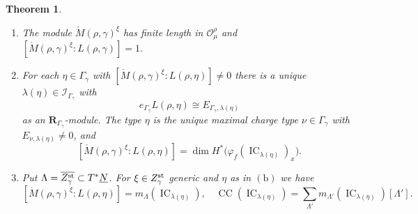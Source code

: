 \documentclass[11pt,reqno]{amsart}
\newtheorem{Theorem}{Theorem}[section]
\theoremstyle{definition}
\theoremstyle{remark}
\def\dN{\underline N}
\def\scrO{\mathscr O}
\def\IC{\operatorname{IC}}
\def\bR{\mathbf R}
\begin{document}
\begin{Theorem}\label{thm:morse-JH}
\hfill
\begin{enumerate}[label=$\mathrm{(\alph*)}$,leftmargin=8mm]
\item\label{item:morse-JH-length}
The module $\mathring M(\rho,\gamma)^\xi$ has finite length in
$\scrO_\mu^\rho$ and $[\mathring M(\rho,\gamma)^\xi:L(\rho,\gamma)]=1.$


\item\label{item:morse-JH-global}
For each $\eta\in\Gamma_\gamma$ with
$[\mathring M(\rho,\gamma)^\xi:L(\rho,\eta)]\ne0$ there is a
unique $\lambda(\eta)\in\mathcal I_{\Gamma_\gamma}$ with
$$e_{\Gamma_\gamma} L(\rho,\eta)\cong E_{\Gamma_\gamma,\lambda(\eta)}$$ as an $\bR_{\Gamma_\gamma}$-module.
The type $\eta$ is the unique maximal charge type
$\nu\in\Gamma_\gamma$ with $E_{\nu,\lambda(\eta)}\ne0$, and
\begin{equation}\label{eq:morse-JH-global}
 [\mathring M(\rho,\gamma)^\xi:L(\rho,\eta)]
 =\dim H^*\bigl(\varphi_f(\IC_{\lambda(\eta)})_x\bigr).
\end{equation}

\item\label{item:morse-JH-CC}
Put $\Lambda=\overline{Z_\gamma^{\rm st}}\subset T^*\dN$.
For $\xi\in Z_\gamma^{\rm st}$ generic and $\eta$ as in $\mathrm{(b)}$ we have
\begin{equation}\label{eq:morse-JH-CC}
 [\mathring M(\rho,\gamma)^\xi:L(\rho,\eta)]
 =m_\Lambda(\IC_{\lambda(\eta)}),\quad
 \operatorname{CC}(\IC_{\lambda(\eta)})=\sum_{\Lambda'}
 m_{\Lambda'}(\IC_{\lambda(\eta)})[\Lambda'].
\end{equation}
\end{enumerate}
\end{Theorem}
\end{document}
